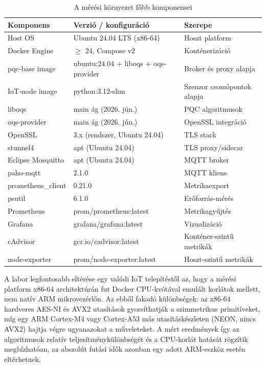 \begin{table}[ht]
\centering
\caption{A mérési környezet főbb komponensei}
\label{tab:env-summary}
\begin{tabular}{lll}
\hline
\textbf{Komponens} & \textbf{Verzió / konfiguráció} & \textbf{Szerepe} \\
\hline
Host OS             & Ubuntu 24.04 LTS (x86-64)          & Hoszt platform \\
Docker Engine       & $\geq$ 24, Compose v2              & Konténerizáció \\
pqc-base image      & ubuntu:24.04 + liboqs + oqs-provider & Broker és proxy alapja \\
IoT-node image      & python:3.12-slim                    & Szenzor csomópontok alapja \\
liboqs              & main ág (2026. jún.)                & PQC algoritmusok \\
oqs-provider        & main ág (2026. jún.)                & OpenSSL integráció \\
OpenSSL             & 3.x (rendszer, Ubuntu 24.04)        & TLS stack \\
stunnel4            & apt (Ubuntu 24.04)                  & TLS proxy/sidecar \\
Eclipse Mosquitto   & apt (Ubuntu 24.04)                  & MQTT broker \\
paho-mqtt           & 2.1.0                               & MQTT kliens \\
prometheus\_client  & 0.21.0                              & Metrikaexport \\
psutil              & 6.1.0                               & Erőforrás-mérés \\
Prometheus          & prom/prometheus:latest              & Metrikagyűjtés \\
Grafana             & grafana/grafana:latest              & Vizualizáció \\
cAdvisor            & gcr.io/cadvisor:latest              & Konténer-szintű metrikák \\
node-exporter       & prom/node-exporter:latest           & Hoszt-szintű metrikák \\
\hline
\end{tabular}
\end{table}

A labor legfontosabb eltérése egy valódi IoT telepítéstől az, hogy a mérési platform
x86-64 architektúrán fut Docker CPU-kvótával emulált korlátok mellett, nem natív ARM
mikrovezérlőn. Az ebből fakadó különbségek: az x86-64 hardveres AES-NI és AVX2 utasítások
gyorsíthatják a szimmetrikus primitíveket, míg egy ARM Cortex-M4 vagy Cortex-A53 más
utasításkészleten (NEON, nincs AVX2) hajtja végre ugyanazokat a műveleteket. A mért
eredmények így az algoritmusok relatív teljesítménykülönbségét és a CPU-korlát hatását
rögzítik megbízhatóan, az abszolút futási idők azonban egy adott ARM-eszköz esetén
eltérhetnek.
